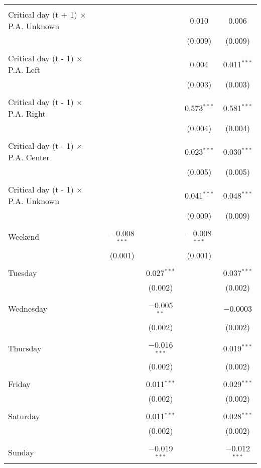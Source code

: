 \documentclass[
]{article}
\begin{document}
\begin{table}[!htbp]
{\begin{tabular}{@{\extracolsep{5pt}}lcccc}
  & & & & \\ 
 Critical day (t + 1) $\times$ P.A. Unknown &  &  & 0.010 & 0.006 \\ 
  &  &  & (0.009) & (0.009) \\ 
  & & & & \\ 
 Critical day (t - 1) $\times$ P.A. Left &  &  & 0.004 & 0.011$^{***}$ \\ 
  &  &  & (0.003) & (0.003) \\ 
  & & & & \\ 
 Critical day (t - 1) $\times$ P.A. Right &  &  & 0.573$^{***}$ & 0.581$^{***}$ \\ 
  &  &  & (0.004) & (0.004) \\ 
  & & & & \\ 
 Critical day (t - 1) $\times$ P.A. Center &  &  & 0.023$^{***}$ & 0.030$^{***}$ \\ 
  &  &  & (0.005) & (0.005) \\ 
  & & & & \\ 
 Critical day (t - 1) $\times$ P.A. Unknown &  &  & 0.041$^{***}$ & 0.048$^{***}$ \\ 
  &  &  & (0.009) & (0.009) \\ 
  & & & & \\ 
 Weekend & $-$0.008$^{***}$ &  & $-$0.008$^{***}$ &  \\ 
  & (0.001) &  & (0.001) &  \\ 
  & & & & \\ 
 Tuesday &  & 0.027$^{***}$ &  & 0.037$^{***}$ \\ 
  &  & (0.002) &  & (0.002) \\ 
  & & & & \\ 
 Wednesday &  & $-$0.005$^{**}$ &  & $-$0.0003 \\ 
  &  & (0.002) &  & (0.002) \\ 
  & & & & \\ 
 Thursday &  & $-$0.016$^{***}$ &  & 0.019$^{***}$ \\ 
  &  & (0.002) &  & (0.002) \\ 
  & & & & \\ 
 Friday &  & 0.011$^{***}$ &  & 0.029$^{***}$ \\ 
  &  & (0.002) &  & (0.002) \\ 
  & & & & \\ 
 Saturday &  & 0.011$^{***}$ &  & 0.028$^{***}$ \\ 
  &  & (0.002) &  & (0.002) \\ 
  & & & & \\ 
 Sunday &  & $-$0.019$^{***}$ &  & $-$0.012$^{***}$ \\ 

\end{tabular}}
\end{table}
\end{document}
